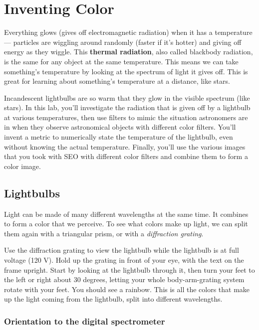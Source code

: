 \chapter{Inventing Color}

Everything glows (gives off electromagnetic radiation) when it has a temperature --- particles are wiggling around randomly (faster if it's hotter) and giving off energy as they wiggle. This \textbf{thermal radiation}, also called blackbody radiation, is the same for any object at the same temperature. This means we can take something's temperature by looking at the spectrum of light it gives off. This is great for learning about something's temperature at a distance, like stars.

Incandescent lightbulbs are so warm that they glow in the visible spectrum (like stars). In this lab, you'll investigate the radiation that is given off by a lightbulb at various temperatures, then use filters to mimic the situation astronomers are in when they observe astronomical objects with different color filters. You'll invent a metric to numerically state the temperature of the lightbulb, even without knowing the actual temperature. Finally, you'll use the various images that you took with SEO with different color filters and combine them to form a color image.

\section{Lightbulbs}

Light can be made of many different wavelengths at the same time. It combines to form a color that we perceive. To see what colors make up light, we can split them again with a triangular prism, or with a \textit{diffraction grating}.

\begin{steps}
	\item Use the diffraction grating to view the lightbulb while the lightbulb is at full voltage (120 V). Hold up the grating in front of your eye, with the text on the frame upright. Start by looking at the lightbulb through it, then turn your feet to the left or right about 30 degrees, letting your whole body-arm-grating system rotate with your feet. You should see a rainbow. This is all the colors that make up the light coming from the lightbulb, split into different wavelengths.
\end{steps}

\subsection{Orientation to the digital spectrometer}

